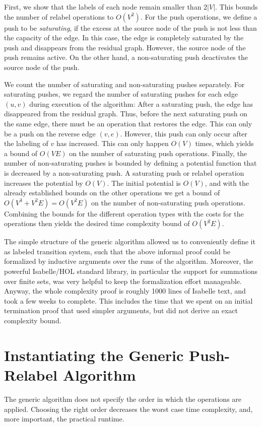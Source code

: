 \documentclass[smallcondensed]{svjour3}     %
\begin{document}
First, we show that the labels of each node remain smaller than $2|V|$. This bounds the number of relabel operations to $O(V^2)$.
For the push operations, we define a push to be \emph{saturating}, if the excess at the source node of the push is not less than the capacity of the edge.
In this case, the edge is completely saturated by the push and disappears from the residual graph. However, the source node of the push remains active.
On the other hand, a non-saturating push deactivates the source node of the push.

We count the number of saturating and non-saturating pushes separately. For saturating pushes, we regard the number of saturating pushes for each edge $(u,v)$ during execution of the algorithm: After a saturating push, the edge has disappeared from the residual graph. Thus, before the next saturating push on the same edge, 
there must be an operation that restores the edge. This can only be a push on the reverse edge $(v,e)$. 
However, this push can only occur after the labeling of $v$ has increased. This can only happen $O(V)$ times, which yields a bound of $O(VE)$ on the number 
of saturating push operations. 
Finally, the number of non-saturating pushes is bounded by defining a potential function that is decreased by a non-saturating push.
A saturating push or relabel operation increases the potential by $O(V)$.
The initial potential is $O(V)$, and with the already established bounds on the other operations we get a bound of
$O(V^3 + V^2E) = O(V^2E)$ on the number of non-saturating push operations. Combining the bounds for the different operation types with the costs for the operations 
then yields the desired time complexity bound of $O(V^2E)$.

The simple structure of the generic algorithm allowed us to conveniently define it as labeled transition system, such that the above informal proof could be formalized
by inductive arguments over the runs of the algorithm.
Moreover, the powerful Isabelle/HOL standard library, in particular the support for summations
over finite sets, was very helpful to keep the formalization effort manageable. 
Anyway, the whole complexity proof is roughly 1000 lines of Isabelle text, and took a few weeks to complete.
This includes the time that we spent on an initial termination proof that used simpler arguments, but did not derive an exact complexity bound.

\section{Instantiating the Generic Push-Relabel Algorithm}\label{sec:prpu-inst}
The generic algorithm does not specify the order in which the operations are applied. 
Choosing the right order decreases the worst case time complexity, and, more important, the practical runtime.
\end{document}
